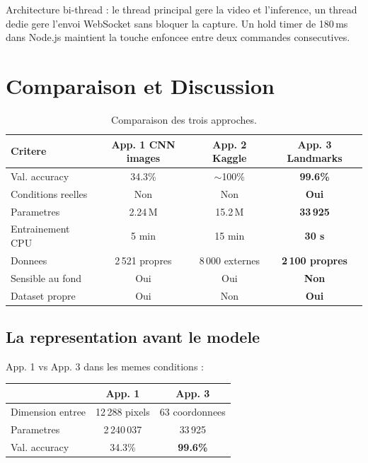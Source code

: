 \documentclass[12pt,a4paper]{article}
\begin{document}
Architecture bi-thread : le thread principal gere la video et l'inference,
un thread dedie gere l'envoi WebSocket sans bloquer la capture.
Un hold timer de 180\,ms dans Node.js maintient la touche enfoncee
entre deux commandes consecutives.

\newpage
\section{Comparaison et Discussion}

\begin{table}[h!]
\centering
\renewcommand{\arraystretch}{1.3}
\begin{tabularx}{\linewidth}{Xccc}
\toprule
\textbf{Critere}
  & App. 1 CNN images
  & App. 2 Kaggle
  & App. 3 Landmarks \\
\midrule
Val. accuracy & 34.3\% & $\sim$100\% & \textbf{99.6\%} \\
Conditions reelles & Non & Non & \textbf{Oui} \\
Parametres & 2.24\,M & 15.2\,M & \textbf{33\,925} \\
Entrainement CPU & 5 min & 15 min & \textbf{30 s} \\
Donnees & 2\,521 propres & 8\,000 externes & \textbf{2\,100 propres} \\
Sensible au fond & Oui & Oui & \textbf{Non} \\
Dataset propre & Oui & Non & \textbf{Oui} \\
\bottomrule
\end{tabularx}
\caption{Comparaison des trois approches.}
\end{table}

\subsection{La representation avant le modele}

App. 1 vs App. 3 dans les memes conditions :

\begin{center}
\begin{tabular}{lcc}
\toprule
& App. 1 & App. 3 \\
\midrule
Dimension entree & 12\,288 pixels & 63 coordonnees \\
Parametres & 2\,240\,037 & 33\,925 \\
Val. accuracy & 34.3\% & \textbf{99.6\%} \\
\bottomrule
\end{tabular}
\end{center}
\end{document}
